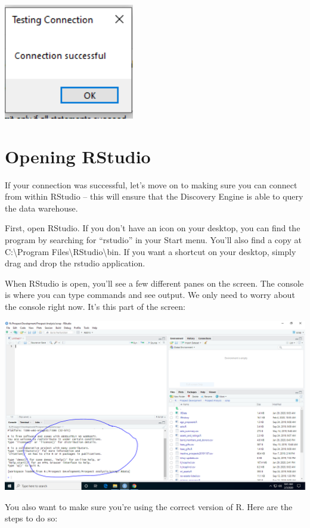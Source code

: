 \documentclass[]{book}
\begin{document}
\includegraphics[width=2.24in]{images/successful}

\hypertarget{opening-rstudio}{%
\section{Opening RStudio}\label{opening-rstudio}}

If your connection was successful, let's move on to making sure you can connect from within RStudio -- this will ensure that the Discovery Engine is able to query the data warehouse.

First, open RStudio. If you don't have an icon on your desktop, you can find the program by searching for ``rstudio'' in your Start menu. You'll also find a copy at C:\textbackslash Program Files\textbackslash RStudio\textbackslash bin. If you want a shortcut on your desktop, simply drag and drop the rstudio application.

When RStudio is open, you'll see a few different panes on the screen. The console is where you can type commands and see output. We only need to worry about the console right now. It's this part of the screen:

\includegraphics[width=21.33in]{images/console}

You also want to make sure you're using the correct version of R. Here are the steps to do so:
\end{document}
